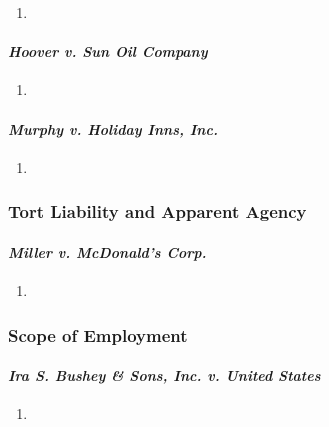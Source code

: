 \begin{enumerate}
    \item %
\end{enumerate}

\paragraph{\emph{Hoover v. Sun Oil Company}}

\begin{enumerate}
    \item %
\end{enumerate}

\paragraph{\emph{Murphy v. Holiday Inns, Inc.}}

\begin{enumerate}
    \item %
\end{enumerate}

\subsubsection{Tort Liability and Apparent Agency}

\paragraph{\emph{Miller v. McDonald's Corp.}}

\begin{enumerate}
    \item %
\end{enumerate}

\subsubsection{Scope of Employment}

\paragraph{\emph{Ira S. Bushey \& Sons, Inc. v. United States}}

\begin{enumerate}
    \item %
\end{enumerate}

